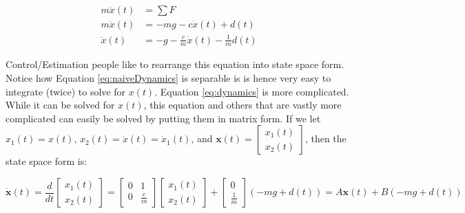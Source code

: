 \documentclass{article}
\begin{document}
\begin{align}
\label{eq:dynamics}
m\ddot{x}(t) &= \sum F \nonumber \\
m\ddot{x}(t) &= -mg-c\dot{x}(t)+d(t)\nonumber\\
\ddot{x}(t) &= -g-\frac{c}{m}\dot{x}(t)-\frac{1}{m}d(t)
\end{align}

Control/Estimation people like to rearrange this equation into state space form.  Notice how Equation \ref{eq:naiveDynamics} is separable is is hence very easy to integrate (twice) to solve for $x(t)$.  Equation \ref{eq:dynamics} is more complicated.  While it can be solved for $x(t)$, this equation and others that are vastly more complicated can easily be solved by putting them in matrix form.  If we let $x_1(t)=x(t)$, $x_2(t)=\dot{x}(t)=\dot{x}_1(t)$, and $\pmb{x}(t)=\begin{bmatrix} x_1(t) \\ x_2(t) \end{bmatrix}$, then the state space form is:

\begin{equation}
\dot{\pmb{x}}(t) = \frac{d}{dt}\begin{bmatrix}x_1(t)\\x_2(t)\end{bmatrix}=\begin{bmatrix} 0 & 1\\ 0 & \frac{c}{m}\end{bmatrix} \begin{bmatrix}x_1(t) \\ x_2(t)\end{bmatrix}+\begin{bmatrix}0\\\frac{1}{m}\end{bmatrix}(-mg+d(t)) = A\pmb{x}(t)+B(-mg+d(t))
\end{equation}
\end{document}
